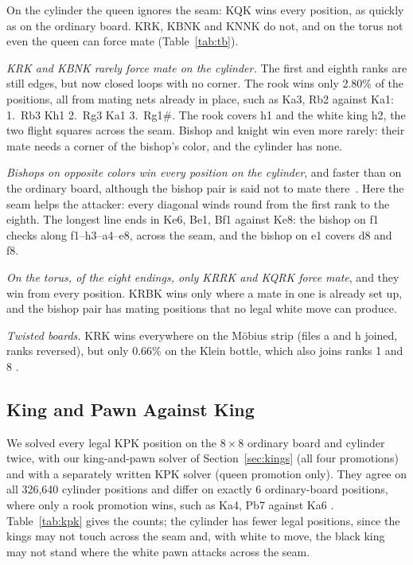 On the cylinder the queen ignores the seam: KQK wins every position, as quickly as on the ordinary board.
KRK, KBNK and KNNK do not, and on the torus not even the queen can force mate
(Table~\ref{tab:tb}).

\emph{KRK and KBNK rarely force mate on the cylinder.} The first and eighth ranks are still edges, but now
closed loops with no corner. The rook wins only 2.80\% of the positions, all from mating nets already
in place, such as Ka3, Rb2 against Ka1: 1.~Rb3 Kh1 2.~Rg3 Ka1 3.~Rg1\#. The rook covers h1 and the
white king h2, the two flight squares across the seam. Bishop and knight win even more rarely: their mate
needs a corner of the bishop's color, and the cylinder has none.

\emph{Bishops on opposite colors win every position on the cylinder}, and faster than on the ordinary board,
although the bishop pair is said not to mate there~\cite{HGMCylinder}.
Here the seam helps the attacker: every diagonal winds round from the first rank to the eighth. The longest
line ends in Ke6, Be1, Bf1 against Ke8: the bishop on f1 checks along f1--h3--a4--e8, across the seam, and
the bishop on e1 covers d8 and f8.

\emph{On the torus, of the eight endings, only KRRK and KQRK force mate}, and they win from every position. KRBK wins only where
a mate in one is already set up, and the bishop pair has mating positions that no legal white move can
produce.

\emph{Twisted boards.} KRK wins everywhere on the M\"obius strip (files a and h joined, ranks reversed), but
only $0.66\%$ on the Klein bottle, which also joins ranks 1 and 8 .

\subsection{King and Pawn Against King}\label{sec:kpk}

We solved every legal KPK position on the $8\times8$ ordinary board and cylinder twice, with our
king-and-pawn solver of Section~\ref{sec:kings} (all four promotions) and with a separately written KPK
solver (queen promotion only). They agree on all 326,640 cylinder positions and differ on exactly 6
ordinary-board positions, where only a rook promotion wins, such as Ka4, Pb7 against
Ka6 . Table~\ref{tab:kpk} gives the counts; the cylinder has fewer legal positions, since the kings
may not touch across the seam and, with white to move, the black king may not stand where the white
pawn attacks across the seam.

